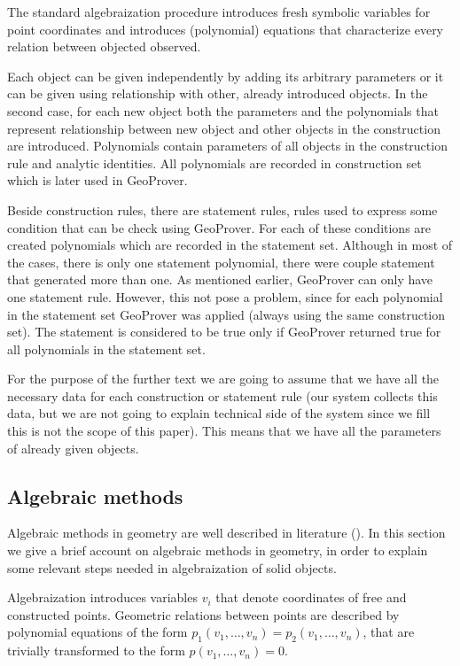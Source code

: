 \documentclass[final,1p,times,authoryear]{elsarticle}
\begin{document}
The standard algebraization procedure introduces fresh symbolic
variables for point coordinates and introduces (polynomial) equations
that characterize every relation between objected observed.

Each object can be given independently by adding its arbitrary
parameters or it can be given using relationship with other, already
introduced objects. In the second case, for each new object both the
parameters and the polynomials that represent relationship between new
object and other objects in the construction are
introduced. Polynomials contain parameters of all objects in the
construction rule and analytic identities. All polynomials are
recorded in construction set which is later used in GeoProver.

Beside construction rules, there are statement rules, rules used to
express some condition that can be check using GeoProver. For each of
these conditions are created polynomials which are recorded in the
statement set. Although in most of the cases, there is only one
statement polynomial, there were couple statement that generated more
than one. As mentioned earlier, GeoProver can only have one statement
rule. However, this not pose a problem, since for each polynomial in
the statement set GeoProver was applied (always using the same
construction set). The statement is considered to be true only if
GeoProver returned true for all polynomials in the statement set.

For the purpose of the further text we are going to assume that we
have all the necessary data for each construction or statement rule
(our system collects this data, but we are not going to explain
technical side of the system since we fill this is not the scope of
this paper). This means that we have all the parameters of already
given objects.

\subsection{Algebraic methods}

Algebraic methods in geometry are well described in literature
(\cite{wu, buchberger}). In this section we give a brief account on
algebraic methods in geometry, in order to explain some relevant steps
needed in algebraization of solid objects.

Algebraization introduces variables $v_i$ that denote coordinates of
free and constructed points. Geometric relations between points are
described by polynomial equations of the form $p_1(v_1, \ldots, v_n) =
p_2(v_1, \ldots, v_n)$, that are trivially transformed to the form
$p(v_1, \ldots, v_n) = 0$. 
\end{document}
